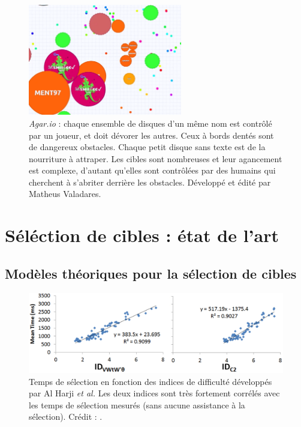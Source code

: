 \begin{appendices}
	\begin{figure}[!htbp]
		\centering
		\includegraphics[width=0.6\textwidth]{figures/ch1/agario}
		\caption[\emph{Agar.io}]{\emph{Agar.io} : chaque ensemble de disques d'un même nom est contrôlé par un joueur, et doit dévorer les autres. Ceux à bords dentés sont de dangereux obstacles. Chaque petit disque sans texte est de la nourriture à attraper. Les cibles sont nombreuses et leur agancement est complexe, d'autant qu'elles sont contrôlées par des humains qui cherchent à s'abriter derrière les obstacles. Développé et édité par Matheus Valadares.}
		\label{fig:agario}
	\end{figure}
	


\cleardoublepage

\FloatBarrier
\chapter{Séléction de cibles : état de l'art}
\minitoc
\label{appendix:annexeC}

\section{Modèles théoriques pour la sélection de cibles}
	\begin{figure}[!htbp]
		\centering
		\includegraphics[width=\textwidth]{figures/ch2/holdID}
		\caption[ID vs. nature du mouvement et temps de sélection]{Temps de sélection en fonction des indices de difficulté développés par Al Harji \emph{et al.} Les deux indices sont très fortement corrélés avec les temps de sélection mesurés (sans aucune assistance à la sélection). Crédit : \cite{hajri2011moving}.}
		\label{fig:holdID}
	\end{figure}



\end{appendices}
